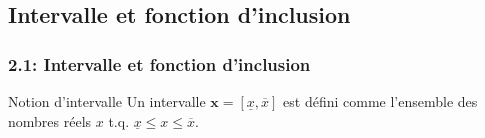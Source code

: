 \documentclass{beamer}
\begin{document}
\subsection{Intervalle et fonction d'inclusion}
\begin{frame}
    \frametitle{2.1: Intervalle et fonction d'inclusion}
    \begin{block}{Notion d'intervalle}
        Un intervalle $\textbf{x} = [\underline{x}, \overline{x}]$ est défini comme l'ensemble des nombres réels $x$ t.q. $\underline{x} \leq x \leq \overline{x}$. 
    \end{block}



\end{frame}
\end{document}
